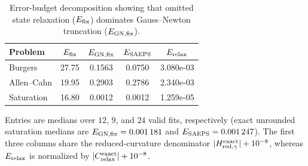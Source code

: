 \begin{table}[!htbp]
\centering
\caption{Error-budget decomposition showing that omitted state relaxation ($E_{\rm fix}$) dominates Gauss--Newton truncation ($E_{\rm GN,fix}$).}
\label{tab:mechanism}
\small
\setlength{\tabcolsep}{4pt}
\begin{tabular}{l S[table-format=2.2] S[table-format=1.4] S[table-format=1.4] S[table-format=1.3e-1,scientific-notation=true]}
\toprule
{Problem} & {$E_{\rm fix}$} & {$E_{\rm GN,fix}$} & {$E_{\rm SAEPS}$} & {$E_{\rm relax}$} \\
\midrule
Burgers & 27.75 & 0.1563 & 0.0750 & 3.080e-03 \\
Allen--Cahn & 19.95 & 0.2903 & 0.2786 & 2.340e-03 \\
Saturation & 16.80 & 0.0012 & 0.0012 & 1.259e-05 \\
\bottomrule
\end{tabular}
\par\vspace{3pt}\begin{minipage}{.98\linewidth}\footnotesize Entries are medians over $12$, $9$, and $24$ valid fits, respectively (exact unrounded saturation medians are $E_{\rm GN,fix}=\num{0.001181}$ and $E_{\rm SAEPS}=\num{0.001247}$). The first three columns share the reduced-curvature denominator $|H_{\mathrm{red},\gamma}^{\mathrm{exact}}|+10^{-8}$, whereas $E_{\rm relax}$ is normalized by $|C_{\mathrm{relax}}^{\mathrm{exact}}|+10^{-8}$.\end{minipage}
\end{table}
